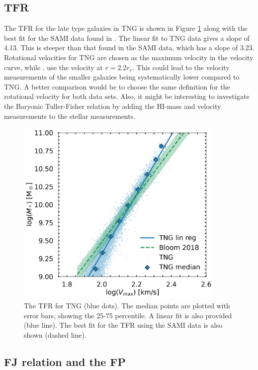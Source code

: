\subsection{TFR}
The TFR for the late type galaxies in TNG is shown in Figure \ref{tfr_res} along with the best fit for the SAMI data found in \textcite{Bloom2017}. The linear fit to TNG data gives a slope of 4.13. This is steeper than that found in the SAMI data, which has a slope of 3.23. Rotational velocities for TNG are chosen as the maximum velocity in the velocity curve, while \textcite{Bloom2017}. use the velocity at $r = 2.2 r_e$. This could lead to the velocity measurements of the smaller galaxies being systematically lower compared to TNG. A better comparison would be to choose the same definition for the rotational velocity for both data sets. Also, it might be interesting to investigate the Baryonic Tuller-Fisher relation by adding the HI-mass and velocity measurements to the stellar measurements.

\begin{figure}
    \centering
    \includegraphics[width=0.9\textwidth]{images/results_tully_fisher.png}
    \caption{The TFR for TNG (blue dots). The median points are plotted with error bars, showing the 25-75 percentile. A linear fit is also provided (blue line). The best fit for the TFR using the SAMI data is also shown (dashed line).}
    \label{tfr_res}
\end{figure}

\subsection{FJ relation and the FP}

